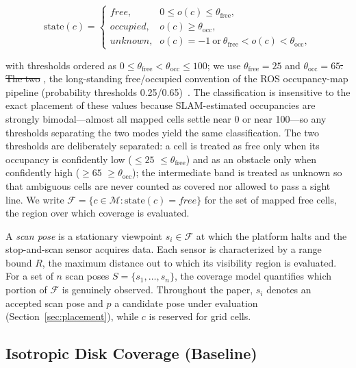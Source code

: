 \documentclass[sensors,article,submit,pdftex,moreauthors]{Definitions/mdpi}
\providecommand{\DIFadd}[1]{{\protect\color{blue} \sf #1}} %
\providecommand{\DIFdel}[1]{{\protect\color{red}\protect\scriptsize\protect\sout{#1}}} %
\providecommand{\DIFaddbegin}{} %
\providecommand{\DIFaddend}{} %
\providecommand{\DIFdelbegin}{} %
\providecommand{\DIFdelend}{} %
\begin{document}
\begin{equation}
\mathrm{state}(c)=
\begin{cases}
\textit{free}, & 0 \le o(c) \le \theta_{\mathrm{free}}, \\
\textit{occupied}, & o(c) \ge \theta_{\mathrm{occ}}, \\
\textit{unknown}, & o(c)=-1 \ \text{or}\ \theta_{\mathrm{free}}<o(c)<\theta_{\mathrm{occ}},
\end{cases}
\end{equation}

with thresholds \DIFaddbegin \DIFadd{ordered as $0\le\theta_{\mathrm{free}}<
\theta_{\mathrm{occ}}\le100$; we use }\DIFaddend $\theta_{\mathrm{free}}=25$ and
$\theta_{\mathrm{occ}}=65$\DIFdelbegin \DIFdel{. The
two }\DIFdelend \DIFaddbegin \DIFadd{, the long-standing free/occupied convention of the
ROS occupancy-map pipeline (probability thresholds 0.25/0.65)~\cite{macenski2020}.
The classification is insensitive to the exact placement of these values
because SLAM-estimated occupancies are strongly bimodal---almost all mapped
cells settle near 0 or near 100---so any thresholds separating the two modes
yield the same classification. The two }\DIFaddend thresholds are deliberately separated: a
cell is treated as free only when its occupancy is confidently low
(\DIFdelbegin \DIFdel{$\le 25$}\DIFdelend \DIFaddbegin \DIFadd{$\le\theta_{\mathrm{free}}$}\DIFaddend ) and as an obstacle only when confidently high
(\DIFdelbegin \DIFdel{$\ge 65$}\DIFdelend \DIFaddbegin \DIFadd{$\ge\theta_{\mathrm{occ}}$}\DIFaddend ); the intermediate band is treated as unknown so
that ambiguous cells are never counted as covered nor allowed to pass a sight
line. We write
$\mathcal{F}=\{c\in\mathcal{M}:\mathrm{state}(c)=\textit{free}\}$ for
the set of mapped free cells, the region over which coverage is evaluated.

A \emph{scan pose} is a stationary viewpoint $s_i\in\mathcal{F}$ at which the
platform halts and the stop-and-scan sensor acquires data. Each sensor is
characterized by a range bound $R$, the maximum distance out to which its
visibility region is evaluated. For a set of $n$ scan poses
$S=\{s_1,\dots,s_n\}$, the coverage model quantifies which portion of
$\mathcal{F}$ is genuinely observed. \DIFaddbegin \DIFadd{Throughout the paper, $s_i$ denotes an
accepted scan pose and $p$ a candidate pose under evaluation
(Section~\ref{sec:placement}), while $c$ is reserved for grid cells.
}\DIFaddend 

\subsection{Isotropic Disk Coverage (Baseline)}
\label{sec:disk}
\end{document}
